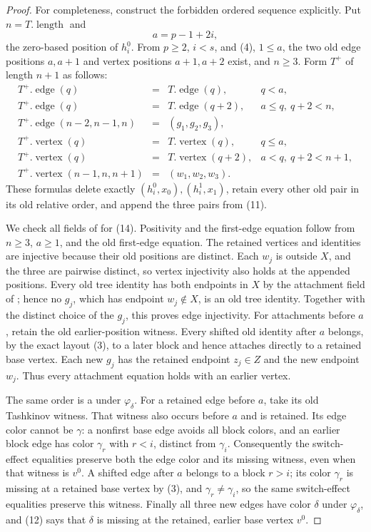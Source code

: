 \begin{proof}
For completeness, construct the forbidden ordered sequence explicitly.
Put $n=T.\operatorname{length}$ and
\[
 a=p-1+2i,                                                   \tag{13}
\]
the zero-based position of $h^0_i$.  From $p\ge2$, $i<s$, and (4),
$1\le a$, the two old edge positions $a,a+1$ and vertex positions
$a+1,a+2$ exist, and $n\ge3$.  Form $T^+$ of length $n+1$ as follows:
\[
\begin{array}{rcll}
 T^+.\operatorname{edge}(q)&=&T.\operatorname{edge}(q),
   &q<a,\\
 T^+.\operatorname{edge}(q)&=&T.\operatorname{edge}(q+2),
   &a\le q,\ q+2<n,\\
 T^+.\operatorname{edge}(n-2,n-1,n)&=&(g_1,g_2,g_3),&\\[2mm]
 T^+.\operatorname{vertex}(q)&=&T.\operatorname{vertex}(q),
   &q\le a,\\
 T^+.\operatorname{vertex}(q)&=&T.\operatorname{vertex}(q+2),
   &a<q,\ q+2<n+1,\\
 T^+.\operatorname{vertex}(n-1,n,n+1)&=&(w_1,w_2,w_3).&
\end{array}                                                  \tag{14}
\]
These formulas delete exactly $(h^0_i,x_0),(h^1_i,x_1)$, retain every
other old pair in its old relative order, and append the three pairs from
(11).

We check all fields of  for (14).  Positivity and
the first-edge equation follow from $n\ge3$, $a\ge1$, and the old
first-edge equation.  The retained vertices and identities are injective
because their old positions are distinct.  Each $w_j$ is outside $X$,
and the three are pairwise distinct, so vertex injectivity also holds at
the appended positions.  Every old tree identity has both endpoints in
$X$ by the attachment field of ; hence no $g_j$,
which has endpoint $w_j\notin X$, is an old tree identity.  Together with
the distinct choice of the $g_j$, this proves edge injectivity.  For
attachments before $a$, retain the old earlier-position witness.  Every
shifted old identity after $a$ belongs, by the exact layout (3), to a
later block and hence attaches directly to a retained base vertex.  Each
new $g_j$ has the retained endpoint $z_j\in Z$ and the new endpoint
$w_j$.  Thus every attachment equation holds with an earlier vertex.

The same order is a  under $\varphi_\delta$.
For a retained edge before $a$, take its old Tashkinov witness.  That
witness also occurs before $a$ and is retained.  Its edge color cannot be
$\gamma$: a nonfirst base edge avoids all block colors, and an earlier
block edge has color $\gamma_r$ with $r<i$, distinct from $\gamma_i$.
Consequently the switch-effect equalities preserve both the edge color
and its missing witness, even when that witness is $v^0$.  A shifted edge
after $a$ belongs to a block $r>i$; its color $\gamma_r$ is missing at a
retained base vertex by (3), and $\gamma_r\ne\gamma_i$, so the same
switch-effect equalities preserve this witness.  Finally all three new
edges have color $\delta$ under $\varphi_\delta$, and (12) says that
$\delta$ is missing at the retained, earlier base vertex $v^0$.


\end{proof}
